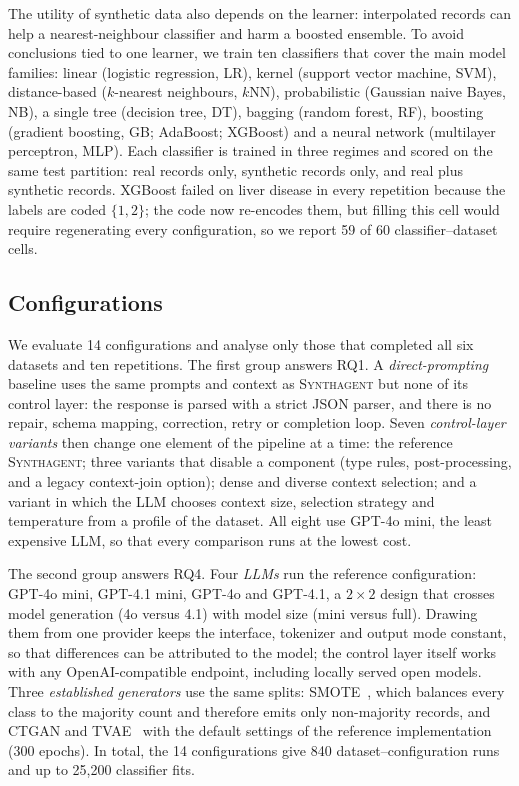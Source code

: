\documentclass[conference]{IEEEtran}
\newcommand{\system}{\textsc{Synthagent}\xspace}
\begin{document}
The utility of synthetic data also depends on the learner: interpolated records can help a nearest-neighbour classifier and harm a boosted ensemble. To avoid conclusions tied to one learner, we train ten classifiers that cover the main model families: linear (logistic regression, LR), kernel (support vector machine, SVM), distance-based ($k$-nearest neighbours, $k$NN), probabilistic (Gaussian naive Bayes, NB), a single tree (decision tree, DT), bagging (random forest, RF), boosting (gradient boosting, GB; AdaBoost; XGBoost) and a neural network (multilayer perceptron, MLP). Each classifier is trained in three regimes and scored on the same test partition: real records only, synthetic records only, and real plus synthetic records. XGBoost failed on liver disease in every repetition because the labels are coded $\{1,2\}$; the code now re-encodes them, but filling this cell would require regenerating every configuration, so we report 59 of 60 classifier--dataset cells.

\subsection{Configurations}
We evaluate 14 configurations and analyse only those that completed all six datasets and ten repetitions. The first group answers RQ1. A \emph{direct-prompting} baseline uses the same prompts and context as \system but none of its control layer: the response is parsed with a strict JSON parser, and there is no repair, schema mapping, correction, retry or completion loop. Seven \emph{control-layer variants} then change one element of the pipeline at a time: the reference \system; three variants that disable a component (type rules, post-processing, and a legacy context-join option); dense and diverse context selection; and a variant in which the LLM chooses context size, selection strategy and temperature from a profile of the dataset. All eight use GPT-4o mini, the least expensive LLM, so that every comparison runs at the lowest cost.

The second group answers RQ4. Four \emph{LLMs} run the reference configuration: GPT-4o mini, GPT-4.1 mini, GPT-4o and GPT-4.1, a $2\times2$ design that crosses model generation (4o versus 4.1) with model size (mini versus full). Drawing them from one provider keeps the interface, tokenizer and output mode constant, so that differences can be attributed to the model; the control layer itself works with any OpenAI-compatible endpoint, including locally served open models. Three \emph{established generators} use the same splits: SMOTE~\cite{chawla2002smote}, which balances every class to the majority count and therefore emits only non-majority records, and CTGAN and TVAE~\cite{xu2019ctgan} with the default settings of the reference implementation (300 epochs). In total, the 14 configurations give 840 dataset--configuration runs and up to 25,200 classifier fits.
\end{document}
